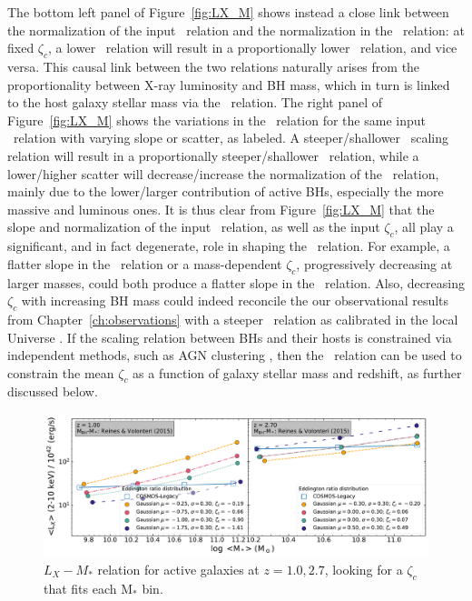 The bottom left panel of Figure~\ref{fig:LX_M} shows instead a close link between the normalization of the input \MBHMS\ relation and the normalization in the \LXMS\ relation: at fixed $\zeta_c$, a lower \MBHMS\ relation will result in a proportionally lower \LXMS\ relation, and vice versa. This causal link between the two relations naturally arises from the proportionality between X-ray luminosity and BH mass, which in turn is linked to the host galaxy stellar mass via the \MBHMS\ relation. The right panel of Figure~\ref{fig:LX_M} shows the variations in the \LXMS\ relation for the same input \MBHMS\ relation with varying slope or scatter, as labeled. A steeper/shallower \MBHMS\ scaling relation will result in a proportionally steeper/shallower \LXMS\ relation, while a lower/higher scatter will decrease/increase the normalization of the \LXMS\ relation, mainly due to the lower/larger contribution of active BHs, especially the more massive and luminous ones. It is thus clear from Figure~\ref{fig:LX_M} that the slope and normalization of the input \MBHMS\ relation, as well as the input $\zeta_c$, all play a significant, and in fact degenerate, role in shaping the \LXMS\ relation. For example, a flatter slope in the \MBHMS\ relation or a mass-dependent $\zeta_c$, progressively decreasing at larger masses, could both produce a flatter slope in the \LXMS\ relation. Also, decreasing $\zeta_c$ with increasing BH mass could indeed reconcile the our observational results from Chapter~\ref{ch:observations} with a steeper \MBHMS\ relation as calibrated in the local Universe \citep[e.g.,][]{2016MNRAS.460.3119S,2018ApJ...869..113D}. If the scaling relation between BHs and their hosts is constrained via independent methods, such as AGN clustering \citep[e.g.,][]{ShankarNat,Allevato21}, then the \LXMS\ relation can be used to constrain the mean $\zeta_c$ as a function of galaxy stellar mass and redshift, as further discussed below.

\begin{figure}
	\includegraphics[width=\textwidth]{Figs/Chapter3/Best_Edd_for_mass_active_z2.7.pdf}
	\caption{$L_X-M_*$ relation for active galaxies at $z=1.0,2.7$, looking for a $\zeta_c$ that fits each M$_*$ bin.}
	\label{fig:LX_foreach_M}
\end{figure}

